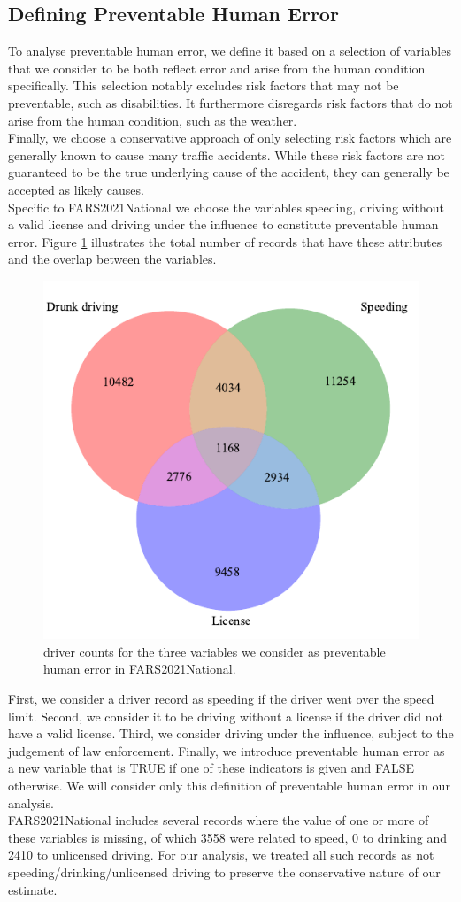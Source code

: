 \documentclass{article}
\theoremstyle{plain}
\theoremstyle{definition}
\theoremstyle{remark}
\begin{document}
\subsection{Defining Preventable Human Error}
To analyse preventable human error, we define it based on a selection of variables that we consider to be both reflect error and arise from the human condition specifically. This selection notably excludes risk factors that may not be preventable, such as disabilities. It furthermore disregards risk factors that do not arise from the human condition, such as the weather.\\
Finally, we choose a conservative approach of only selecting risk factors which are generally known to cause many traffic accidents. While these risk factors are not guaranteed to be the true underlying cause of the accident, they can generally be accepted as likely causes.
\\
Specific to FARS2021National we choose the variables speeding, driving without a valid license and driving under the influence to constitute preventable human error. Figure \ref{fig:drivers-err-overlap} illustrates the total number of records that have these attributes and the overlap between the variables.

\begin{figure}[ht]
	\vskip 0.2in
	\begin{center}
		\centerline{\includegraphics[width=0.49\columnwidth]{plots/drivers-err-overlap}}
		\caption{driver counts for the three variables we consider as preventable human error in FARS2021National.}
		\label{fig:drivers-err-overlap}
	\end{center}
	\vskip -0.2in
\end{figure}

First, we consider a driver record as speeding if the driver went over the speed limit. Second, we consider it to be driving without a license if the driver did not have a valid license. Third, we consider driving under the influence, subject to the judgement of law enforcement. Finally, we introduce preventable human error as a new variable that is TRUE if one of these indicators is given and FALSE otherwise. We will consider only this definition of preventable human error in our analysis.
\\
FARS2021National includes several records where the value of one or more of these variables is missing, of which 3558 were related to speed, 0 to drinking and 2410 to unlicensed driving. For our analysis, we treated all such records as not speeding/drinking/unlicensed driving to preserve the conservative nature of our estimate.
\end{document}

